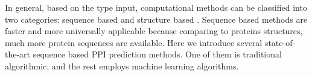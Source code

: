 In general, based on the type input, computational methods can be classified into two categories: sequence based and structure based \cite{zhang2018review}. Sequence based methods \cite{ Martin05_PPIpred,Pitre06_PIPE,Shen07_PPIpred,Guo08_PPIpred,yu2010predicting, xia2010predicting,shi2010predicting, guo2010pred_ppi,zhang2011adaptive, liu2012spps, yousef2013novel,zahiri2013ppievo, zahiri2014locfuse, you2015detecting, hamp2015evolutionary, jia2015prediction, huang2015using,   you2015predicting, hamp2015more, ding2016predicting,gao2016ens, huang2016sequence, an2016using,you2017improved, hashemifar2018predicting, chen2019multifaceted, chen2019protein} are faster and more universally applicable because comparing to proteins structures, much more protein sequences are available. Here we introduce several state-of-the-art sequence based PPI prediction methods. One of them is traditional algorithmic, and the rest employs machine learning algorithms.

